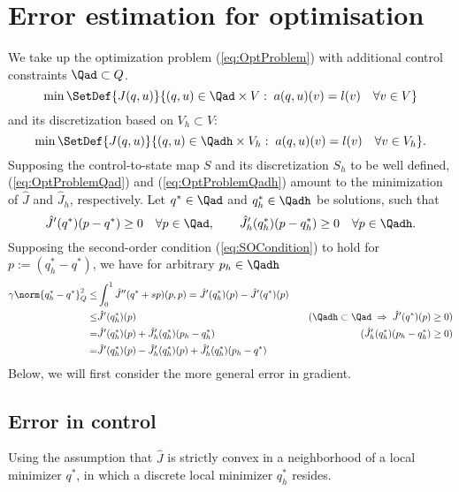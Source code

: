 %
\section{Error estimation for optimisation}\label{sec:errestopt}
%
We take up the optimization problem (\ref{eq:OptProblem}) with additional control constraints $\Qad\subset Q$. 
%
\begin{equation}\label{eq:OptProblemQad}
\min\SetDef{J(q,u) }{  (q,u)\in \Qad\times V:\; a(q,u)(v) = l(v)\quad\forall v\in V}
\end{equation}
%
and its discretization based on $V_h\subset V$:
%
\begin{equation}\label{eq:OptProblemQadh}
\min\SetDef{J(q,u)  }{  (q,u)\in \Qadh\times V_h:\; a(q,u)(v) = l(v)\quad\forall v\in V_h}.
\end{equation}
%
Supposing the control-to-state map $S$ and its discretization $S_h$ to be well defined, (\ref{eq:OptProblemQad}) and (\ref{eq:OptProblemQadh}) amount to the minimization of $\hat J$ and $\hat J_h$, respectively.
Let $q^*\in\Qad$ and $q^*_h\in\Qadh$ be solutions, such that
%
\begin{equation}\label{eq:FO}
\hat J'(q^*)(p-q^*) \ge 0\quad \forall p\in \Qad,\qquad \hat J_h'(q^*_h)(p-q^*_h) \ge 0\quad \forall p\in \Qadh.
\end{equation}
%
Supposing the second-order condition (\ref{eq:SOCondition}) to hold for $p := (q^*_h-q^*)$, we have for arbitrary $p_h\in\Qadh$
%
\begin{align*}
\gamma \norm{q^*_h-q^*}_Q^2 \le& \int_0^1 \hat J''(q^*+sp)(p,p) = \hat J'(q^*_h)(p) - \hat J'(q^*)(p)&\\
\le& \hat J'(q^*_h)(p) &\quad(\Qadh\subset\Qad\;\Rightarrow\; \hat J'(q^*)(p) \ge 0)\\
=& \hat J'(q^*_h)(p) + \hat J_h'(q^*_h)(p_h - q_h^*) &\quad(\hat J_h'(q^*_h)(p_h - q_h^*)\ge 0)\\
=& \hat J'(q^*_h)(p) - \hat J_h'(q^*_h)(p) + \hat J_h'(q^*_h)(p_h - q^*) &
\end{align*}
%
Below, we will first consider the more general error in gradient.
%
\subsection{Error in control}\label{subsec:}
%
Using the assumption that $\hat J$ is strictly convex in a neighborhood of a local minimizer $q^*$, in which 
a discrete local minimizer $q^*_h$ resides.

